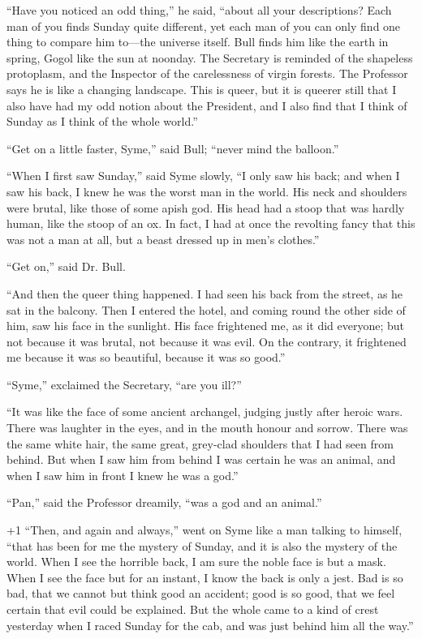 “Have you noticed an odd thing,” he said, “about all your descriptions? Each man of you finds Sunday quite different, yet each man of you can only find one thing to compare him to⁠—the universe itself. Bull finds him like the earth in spring, Gogol like the sun at noonday. The Secretary is reminded of the shapeless protoplasm, and the Inspector of the carelessness of virgin forests. The Professor says he is like a changing landscape. This is queer, but it is queerer still that I also have had my odd notion about the President, and I also find that I think of Sunday as I think of the whole world.”

“Get on a little faster, Syme,” said Bull; “never mind the balloon.”

“When I first saw Sunday,” said Syme slowly, “I only saw his back; and when I saw his back, I knew he was the worst man in the world. His neck and shoulders were brutal, like those of some apish god. His head had a stoop that was hardly human, like the stoop of an ox. In fact, I had at once the revolting fancy that this was not a man at all, but a beast dressed up in men’s clothes.”

“Get on,” said Dr. Bull.

“And then the queer thing happened. I had seen his back from the street, as he sat in the balcony. Then I entered the hotel, and coming round the other side of him, saw his face in the sunlight. His face frightened me, as it did everyone; but not because it was brutal, not because it was evil. On the contrary, it frightened me because it was so beautiful, because it was so good.”

“Syme,” exclaimed the Secretary, “are you ill?”

“It was like the face of some ancient archangel, judging justly after heroic wars. There was laughter in the eyes, and in the mouth honour and sorrow. There was the same white hair, the same great, grey-clad shoulders that I had seen from behind. But when I saw him from behind I was certain he was an animal, and when I saw him in front I knew he was a god.”

“Pan,” said the Professor dreamily, “was a god and an animal.”

\looseness+1
“Then, and again and always,” went on Syme like a man talking to himself, “that has been for me the mystery of Sunday, and it is also the mystery of the world. When I see the horrible back, I am sure the noble face is but a mask. When I see the face but for an instant, I know the back is only a jest. Bad is so bad, that we cannot but think good an accident; good is so good, that we feel certain that evil could be explained. But the whole came to a kind of crest yesterday when I raced Sunday for the cab, and was just behind him all the way.”

